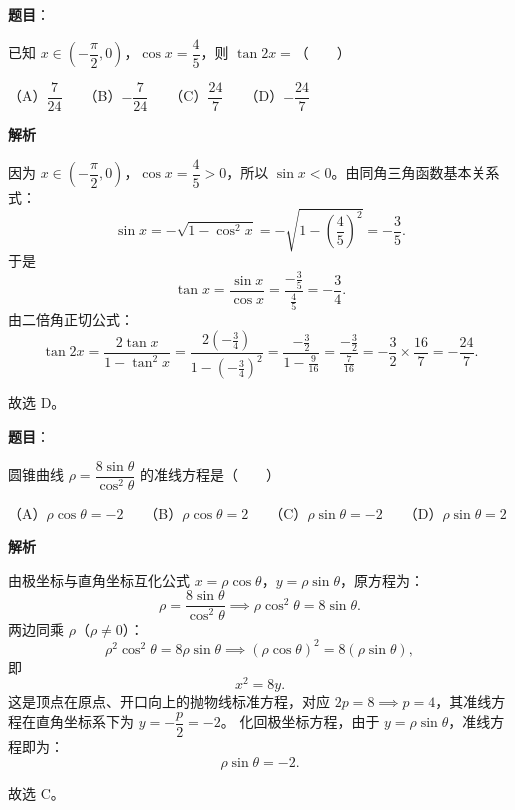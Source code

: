 \begin{answer}

\textbf{题目}：

已知 $x \in \left(-\dfrac{\pi}{2}, 0\right)$，$\cos x = \dfrac{4}{5}$，则 $\tan 2x =$\mbox{（　　）}

（A）$\dfrac{7}{24}$　　（B）$-\dfrac{7}{24}$　　（C）$\dfrac{24}{7}$　　（D）$-\dfrac{24}{7}$

\textbf{解析}

因为 $x \in \left(-\dfrac{\pi}{2}, 0\right)$，$\cos x = \dfrac{4}{5} > 0$，所以 $\sin x < 0$。由同角三角函数基本关系式：
\nopagebreak[4]
\[\sin x = -\sqrt{1 - \cos^2 x} = -\sqrt{1 - \left(\frac{4}{5}\right)^2} = -\frac{3}{5}.\]
于是
\nopagebreak[4]
\[\tan x = \frac{\sin x}{\cos x} = \frac{-\frac{3}{5}}{\frac{4}{5}} = -\frac{3}{4}.\]
由二倍角正切公式：
\nopagebreak[4]
\[\tan 2x = \frac{2\tan x}{1 - \tan^2 x} = \frac{2 \left(-\frac{3}{4}\right)}{1 - \left(-\frac{3}{4}\right)^2} = \frac{-\frac{3}{2}}{1 - \frac{9}{16}} = \frac{-\frac{3}{2}}{\frac{7}{16}} = -\frac{3}{2} \times \frac{16}{7} = -\frac{24}{7}.\]

故选 D。


\end{answer}
\begin{answer}

\textbf{题目}：

圆锥曲线 $\rho = \dfrac{8\sin\theta}{\cos^2\theta}$ 的准线方程是\mbox{（　　）}

（A）$\rho\cos\theta = -2$　　（B）$\rho\cos\theta = 2$　　（C）$\rho\sin\theta = -2$　　（D）$\rho\sin\theta = 2$

\textbf{解析}

由极坐标与直角坐标互化公式 $x = \rho\cos\theta$，$y = \rho\sin\theta$，原方程为：
\nopagebreak[4]
\[\rho = \frac{8\sin\theta}{\cos^2\theta} \implies \rho\cos^2\theta = 8\sin\theta.\]
两边同乘 $\rho$（$\rho \ne 0$）：
\nopagebreak[4]
\[\rho^2\cos^2\theta = 8\rho\sin\theta \implies (\rho\cos\theta)^2 = 8(\rho\sin\theta),\]
即
\nopagebreak[4]
\[x^2 = 8y.\]
这是顶点在原点、开口向上的抛物线标准方程，对应 $2p = 8 \implies p = 4$，其准线方程在直角坐标系下为 $y = -\dfrac{p}{2} = -2$。
化回极坐标方程，由于 $y = \rho\sin\theta$，准线方程即为：
\nopagebreak[4]
\[\rho\sin\theta = -2.\]

故选 C。


\end{answer}
